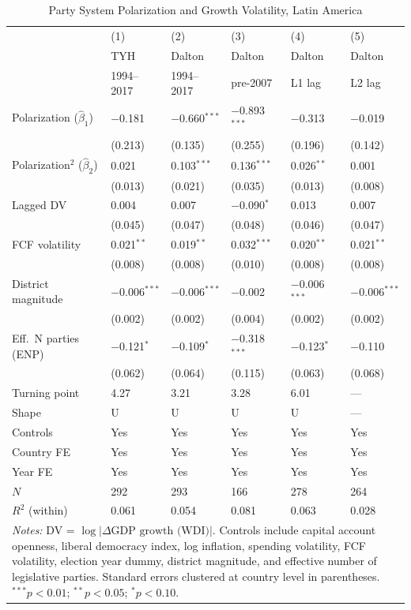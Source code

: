 \documentclass[12pt]{article}
\begin{document}
\begin{table}[H]
\centering
\caption{Party System Polarization and Growth Volatility, Latin America}
\label{tab:main}

\begin{tabular}{@{}lp{1.8cm}p{1.8cm}p{1.8cm}p{1.8cm}p{1.8cm}@{}}
\toprule
 & (1) & (2) & (3) & (4) & (5) \\
 & TYH & Dalton & Dalton & Dalton & Dalton \\
 & 1994--2017 & 1994--2017 & pre-2007 & L1 lag & L2 lag \\
\midrule
Polarization ($\hat{\beta}_1$) & $-$0.181 & $-$0.660$^{***}$ & $-$0.893$^{***}$ & $-$0.313 & $-$0.019 \\
 & (0.213) & (0.135) & (0.255) & (0.196) & (0.142) \\[4pt]
Polarization$^2$ ($\hat{\beta}_2$) & 0.021 & 0.103$^{***}$ & 0.136$^{***}$ & 0.026$^{**}$ & 0.001 \\
 & (0.013) & (0.021) & (0.035) & (0.013) & (0.008) \\[4pt]
Lagged DV & 0.004 & 0.007 & $-$0.090$^{*}$ & 0.013 & 0.007 \\
 & (0.045) & (0.047) & (0.048) & (0.046) & (0.047) \\[4pt]
FCF volatility & 0.021$^{**}$ & 0.019$^{**}$ & 0.032$^{***}$ & 0.020$^{**}$ & 0.021$^{**}$ \\
 & (0.008) & (0.008) & (0.010) & (0.008) & (0.008) \\[4pt]
District magnitude & $-$0.006$^{***}$ & $-$0.006$^{***}$ & $-$0.002 & $-$0.006$^{***}$ & $-$0.006$^{***}$ \\
 & (0.002) & (0.002) & (0.004) & (0.002) & (0.002) \\[4pt]
Eff.\ N parties (ENP) & $-$0.121$^{*}$ & $-$0.109$^{*}$ & $-$0.318$^{***}$ & $-$0.123$^{*}$ & $-$0.110 \\
 & (0.062) & (0.064) & (0.115) & (0.063) & (0.068) \\
\midrule
Turning point & 4.27 & 3.21 & 3.28 & 6.01 & --- \\
Shape & U & U & U & U & --- \\
Controls & Yes & Yes & Yes & Yes & Yes \\
Country FE & Yes & Yes & Yes & Yes & Yes \\
Year FE & Yes & Yes & Yes & Yes & Yes \\
$N$ & 292 & 293 & 166 & 278 & 264 \\
$R^2$ (within) & 0.061 & 0.054 & 0.081 & 0.063 & 0.028 \\
\bottomrule
\multicolumn{6}{p{0.96\textwidth}}{\footnotesize\textit{Notes:} DV = $\log|\Delta\text{GDP growth (WDI)}|$. Controls include capital account openness, liberal democracy index, log inflation, spending volatility, FCF volatility, election year dummy, district magnitude, and effective number of legislative parties. Standard errors clustered at country level in parentheses. $^{***}p<0.01$; $^{**}p<0.05$; $^{*}p<0.10$.}
\end{tabular}
\end{table}
\end{document}
